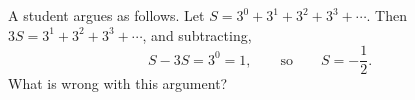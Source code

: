 A student argues as follows. Let $S=3^0+3^1+3^2+3^3+\cdots$. Then $3S=3^1+3^2+3^3+\cdots$, and subtracting,
\[
S-3S=3^0=1,\qquad\text{so}\qquad S=-\dfrac{1}{2} .
\]
What is wrong with this argument?

